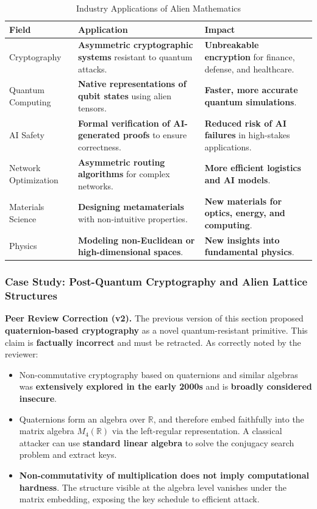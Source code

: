 \documentclass[11pt, a4paper]{article}
\begin{document}
\begin{table}[h]
\centering
\caption{Industry Applications of Alien Mathematics}
\label{tab:applications}
\begin{tabular}{|>{\raggedright\arraybackslash}p{3cm}|>{\raggedright\arraybackslash}p{5cm}|>{\raggedright\arraybackslash}p{4cm}|}
\hline
\textbf{Field} & \textbf{Application} & \textbf{Impact} \\
\hline
Cryptography & \textbf{Asymmetric cryptographic systems} resistant to quantum attacks. & \textbf{Unbreakable encryption} for finance, defense, and healthcare. \\
\hline
Quantum Computing & \textbf{Native representations of qubit states} using alien tensors. & \textbf{Faster, more accurate quantum simulations}. \\
\hline
AI Safety & \textbf{Formal verification of AI-generated proofs} to ensure correctness. & \textbf{Reduced risk of AI failures} in high-stakes applications. \\
\hline
Network Optimization & \textbf{Asymmetric routing algorithms} for complex networks. & \textbf{More efficient logistics and AI models}. \\
\hline
Materials Science & \textbf{Designing metamaterials} with non-intuitive properties. & \textbf{New materials for optics, energy, and computing}. \\
\hline
Physics & \textbf{Modeling non-Euclidean or high-dimensional spaces}. & \textbf{New insights into fundamental physics}. \\
\hline
\end{tabular}
\end{table}


\subsubsection{Case Study: Post-Quantum Cryptography and Alien Lattice Structures}

\textbf{\color{red}Peer Review Correction (v2).} The previous version of this section proposed \textbf{quaternion-based cryptography} as a novel quantum-resistant primitive. This claim is \textbf{factually incorrect} and must be retracted. As correctly noted by the reviewer:
\begin{itemize}
    \item Non-commutative cryptography based on quaternions and similar algebras was \textbf{extensively explored in the early 2000s} and is \textbf{broadly considered insecure}.
    \item Quaternions form an algebra over $\mathbb{R}$, and therefore embed faithfully into the matrix algebra $M_4(\mathbb{R})$ via the left-regular representation. A classical attacker can use \textbf{standard linear algebra} to solve the conjugacy search problem and extract keys.
    \item \textbf{Non-commutativity of multiplication does not imply computational hardness}. The structure visible at the algebra level vanishes under the matrix embedding, exposing the key schedule to efficient attack.
\end{itemize}
\end{document}

